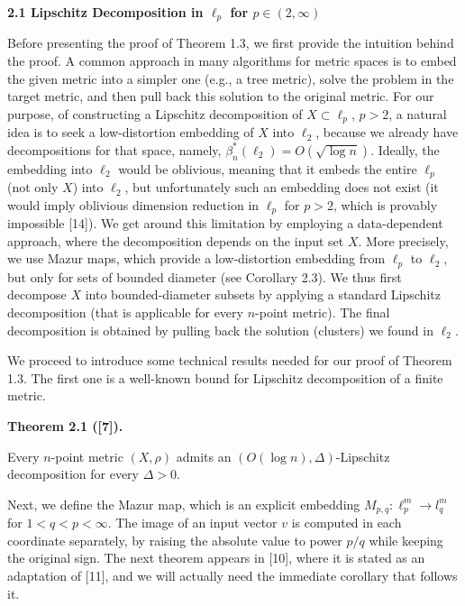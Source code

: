 \documentclass[10pt,a4paper]{amsart}
\begin{document}
\par
\par
\par\medskip\noindent\textbf{2.1 Lipschitz Decomposition in $\ell_{p}$ for $p\in(2,\infty)$}\par
Before presenting the proof of Theorem 1.3, we first provide the intuition behind the proof. A common approach in many algorithms for metric spaces is to embed the given metric into a simpler one (e.g., a tree metric), solve the problem in the target metric, and then pull back this solution to the original metric. For our purpose, of constructing a Lipschitz decomposition of $X\subset\ell_{p}$, $p>2$, a natural idea is to seek a low-distortion embedding of $X$ into $\ell_{2}$, because we already have decompositions for that space, namely, $\beta^{*}_{n}(\ell_{2})=O(\sqrt{\log{n}})$. Ideally, the embedding into $\ell_{2}$ would be oblivious, meaning that it embeds the entire $\ell_{p}$ (not only $X$) into $\ell_{2}$, but unfortunately such an embedding does not exist (it would imply oblivious dimension reduction in $\ell_{p}$ for $p>2$, which is provably impossible [14]). We get around this limitation by employing a data-dependent approach, where the decomposition depends on the input set $X$. More precisely, we use Mazur maps, which provide a low-distortion embedding from $\ell_{p}$ to $\ell_{2}$, but only for sets of bounded diameter (see Corollary 2.3). We thus first decompose $X$ into bounded-diameter subsets by applying a standard Lipschitz decomposition (that is applicable for every $n$-point metric). The final decomposition is obtained by pulling back the solution (clusters) we found in $\ell_{2}$.
\par
\par
We proceed to introduce some technical results needed for our proof of Theorem 1.3. The first one is a well-known bound for Lipschitz decomposition of a finite metric.
\par
\par
\par\medskip\noindent\textbf{Theorem 2.1 ([7]).}\par
Every $n$-point metric $(X,\rho)$ admits an $\left(O\left(\log n\right),\Delta\right)$-Lipschitz decomposition for every $\Delta>0$.
\par
\par
\par
Next, we define the Mazur map, which is an explicit embedding $M_{p,q}:\ell_{p}^{m}\to l_{q}^{m}$ for $1<q<p<\infty$. The image of an input vector $v$ is computed in each coordinate separately, by raising the absolute value to power $p/q$ while keeping the original sign. The next theorem appears in [10], where it is stated as an adaptation of [11], and we will actually need the immediate corollary that follows it.
\end{document}
